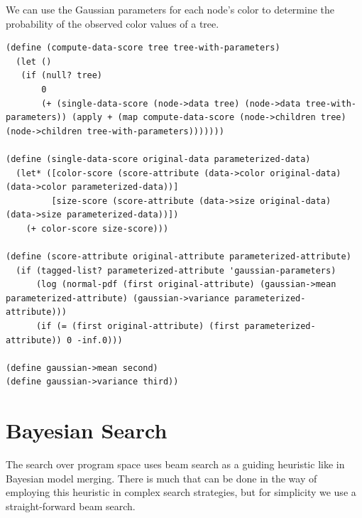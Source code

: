 \documentclass[a4paper,10pt]{article}
\begin{document}
We can use the Gaussian parameters for each node's color to determine the probability of the observed color values of a tree.
\begin{lstlisting}[frame=trBL]
(define (compute-data-score tree tree-with-parameters)
  (let ()
   (if (null? tree)
       0
       (+ (single-data-score (node->data tree) (node->data tree-with-parameters)) (apply + (map compute-data-score (node->children tree) (node->children tree-with-parameters)))))))

(define (single-data-score original-data parameterized-data)
  (let* ([color-score (score-attribute (data->color original-data) (data->color parameterized-data))]
         [size-score (score-attribute (data->size original-data) (data->size parameterized-data))])
    (+ color-score size-score)))

(define (score-attribute original-attribute parameterized-attribute)
  (if (tagged-list? parameterized-attribute 'gaussian-parameters)
      (log (normal-pdf (first original-attribute) (gaussian->mean parameterized-attribute) (gaussian->variance parameterized-attribute)))
      (if (= (first original-attribute) (first parameterized-attribute)) 0 -inf.0)))

(define gaussian->mean second)
(define gaussian->variance third))

\end{lstlisting}

\section{Bayesian Search}
The search over program space uses beam search as a guiding heuristic like in Bayesian model merging.  There is much that can be done in the way of employing this heuristic in complex search strategies, but for simplicity we use a straight-forward beam search.  
\end{document}
